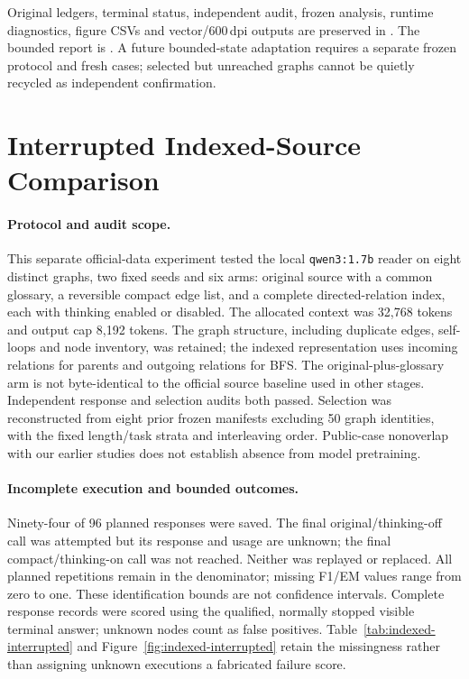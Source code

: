\documentclass[10pt]{article}
\begin{document}
Original ledgers, terminal status, independent audit, frozen analysis, runtime diagnostics, figure CSVs and vector/600\,dpi outputs are preserved in \protect{}. The bounded report is \protect{}. A future bounded-state adaptation requires a separate frozen protocol and fresh cases; selected but unreached graphs cannot be quietly recycled as independent confirmation.

\section{Interrupted Indexed-Source Comparison}
\label{app:indexed-source}

\paragraph{Protocol and audit scope.} This separate official-data experiment tested the local \texttt{qwen3:1.7b} reader on eight distinct graphs, two fixed seeds and six arms: original source with a common glossary, a reversible compact edge list, and a complete directed-relation index, each with thinking enabled or disabled. The allocated context was 32,768 tokens and output cap 8,192 tokens. The graph structure, including duplicate edges, self-loops and node inventory, was retained; the indexed representation uses incoming relations for parents and outgoing relations for BFS. The original-plus-glossary arm is not byte-identical to the official source baseline used in other stages. Independent response and selection audits both passed. Selection was reconstructed from eight prior frozen manifests excluding 50 graph identities, with the fixed length/task strata and interleaving order. Public-case nonoverlap with our earlier studies does not establish absence from model pretraining.

\paragraph{Incomplete execution and bounded outcomes.} Ninety-four of 96 planned responses were saved. The final original/thinking-off call was attempted but its response and usage are unknown; the final compact/thinking-on call was not reached. Neither was replayed or replaced. All planned repetitions remain in the denominator; missing F1/EM values range from zero to one. These identification bounds are not confidence intervals. Complete response records were scored using the qualified, normally stopped visible terminal answer; unknown nodes count as false positives. Table~\ref{tab:indexed-interrupted} and Figure~\ref{fig:indexed-interrupted} retain the missingness rather than assigning unknown executions a fabricated failure score.
\end{document}
